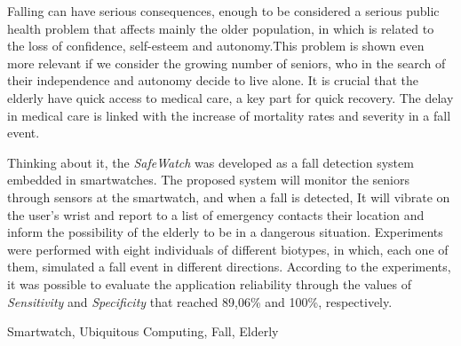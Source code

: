 
Falling can have serious consequences, enough to be considered a serious public health problem that affects mainly the older population, in which is related to the loss of confidence, self-esteem and autonomy.This problem is shown even more relevant if we consider the growing number of seniors, who in the search of their independence and autonomy decide to live alone. It is crucial that the elderly have quick access to medical care, a key part for  quick recovery. The delay in medical care is linked with the increase of mortality rates and severity in a fall event.

Thinking about it, the \textit{SafeWatch} was developed as a fall detection system embedded in smartwatches. The proposed system will monitor the seniors through sensors at the smartwatch, and when a fall is detected, It will vibrate on the user's wrist and report to a list of emergency contacts their location and inform the possibility of the elderly to be in a dangerous situation. Experiments were performed with eight individuals of different biotypes, in which, each one of them, simulated a fall event in different directions. According to the experiments, it was possible to evaluate the application reliability through the values of \textit{Sensitivity} and \textit{Specificity} that reached 89,06\% and 100\%, respectively.



\begin{keywords}
	Smartwatch, Ubiquitous Computing,  Fall, Elderly
\end{keywords}